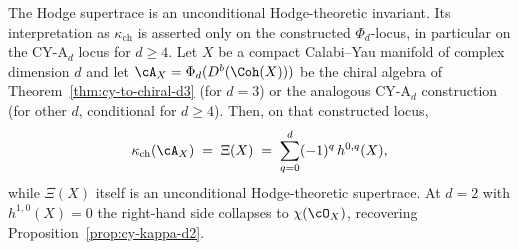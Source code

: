\begin{theorem}
\label{thm:kappa-hodge-supertrace-identification}
The Hodge supertrace is an unconditional Hodge-theoretic invariant. Its
interpretation as \(\kappa_{\mathrm{ch}}\) is asserted only on the constructed
\(\Phi_d\)-locus, in particular on the CY-A$_d$ locus for \(d\geq4\).
Let $X$ be a compact Calabi--Yau manifold of complex dimension $d$ and
let $\cA_X = \Phi_d(D^b(\Coh(X)))$ be the chiral algebra of
Theorem~\ref{thm:cy-to-chiral-d3} (for $d = 3$) or the analogous CY-A$_d$
construction (for other $d$, conditional for $d\geq4$). Then, on that
constructed locus,
\[
 \kappa_{\mathrm{ch}}(\cA_X) \;=\; \Xi(X) \;=\;
 \sum_{q = 0}^{d} (-1)^q\, h^{0,q}(X),
\]
while \(\Xi(X)\) itself is an unconditional Hodge-theoretic supertrace.
At $d = 2$
with $h^{1,0}(X) = 0$ the right-hand side collapses to $\chi(\cO_X)$,
recovering Proposition~\ref{prop:cy-kappa-d2}.
\end{theorem}

